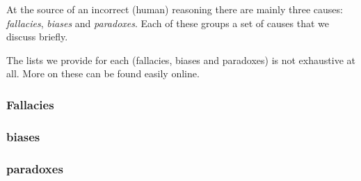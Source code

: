 \documentclass{subfiles}
\begin{document}
    At the source of an incorrect (human) reasoning there are mainly three causes:
        \emph{fallacies}, \emph{biases} and \emph{paradoxes}. 
        Each of these groups a set of causes that we discuss briefly.
        
        \begin{remark*}
            The lists we provide for each (fallacies, biases and paradoxes)
                is not exhaustive at all. More on these can be found easily online.
        \end{remark*}

        \subsubsection{Fallacies}
        

        \subsubsection{biases}
        

        \subsubsection{paradoxes}
        
\end{document}
